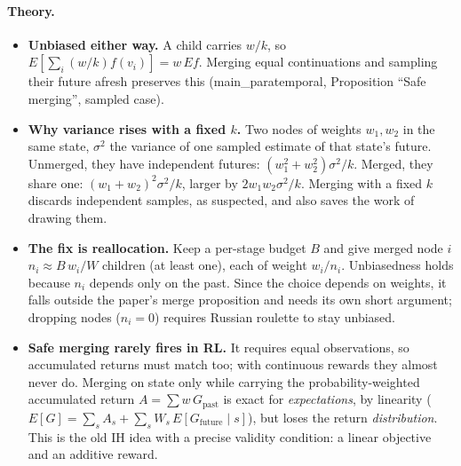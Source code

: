 \documentclass[11pt]{article}
\begin{document}
\paragraph{Theory.}
\begin{itemize}
\item \textbf{Unbiased either way.} A child carries $w/k$, so $E[\sum_i (w/k) f(v_i)] = w\,E f$. Merging equal
  continuations and sampling their future afresh preserves this (main\_paratemporal, Proposition ``Safe merging'',
  sampled case).
\item \textbf{Why variance rises with a fixed $k$.} Two nodes of weights $w_1, w_2$ in the same state, $\sigma^2$ the
  variance of one sampled estimate of that state's future. Unmerged, they have independent futures:
  $(w_1^2+w_2^2)\sigma^2/k$. Merged, they share one: $(w_1+w_2)^2\sigma^2/k$, larger by $2w_1w_2\sigma^2/k$. Merging
  with a fixed $k$ discards independent samples, as suspected, and also saves the work of drawing them.
\item \textbf{The fix is reallocation.} Keep a per-stage budget $B$ and give merged node $i$ $n_i\approx B\,w_i/W$ children
  (at least one), each of weight $w_i/n_i$. Unbiasedness holds because $n_i$ depends only on the past. Since the choice
  depends on weights, it falls outside the paper's merge proposition and needs its own short argument; dropping nodes
  ($n_i=0$) requires Russian roulette to stay unbiased.
\item \textbf{Safe merging rarely fires in RL.} It requires equal observations, so accumulated returns must match too;
  with continuous rewards they almost never do. Merging on state only while carrying the probability-weighted
  accumulated return $A=\sum w\,G_{\text{past}}$ is exact for \emph{expectations}, by linearity
  ($E[G]=\sum_s A_s+\sum_s W_s\,E[G_{\text{future}}\mid s]$), but loses the return \emph{distribution}. This is the old IH
  idea with a precise validity condition: a linear objective and an additive reward.
\end{itemize}
\end{document}
